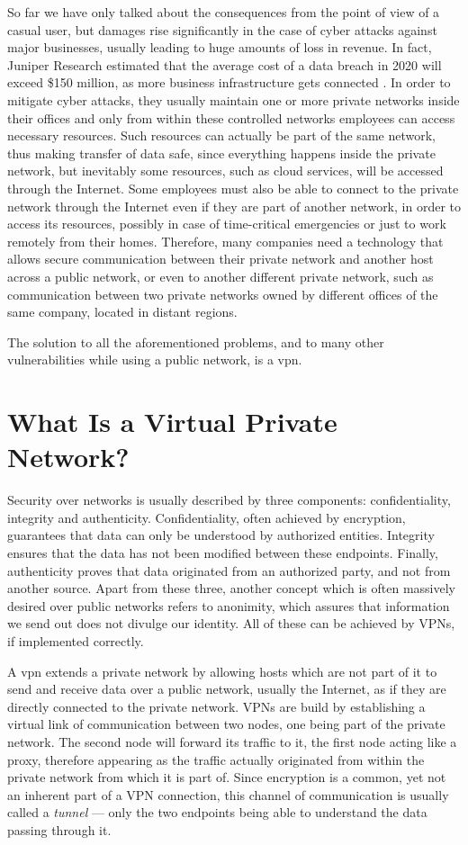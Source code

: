\documentclass[a4paper,12pt]{report}
\begin{document}
		So far we have only talked about the consequences from the point of view of a casual user, but damages rise significantly in the case of cyber attacks against major businesses, usually leading to huge amounts of loss in revenue. In fact, Juniper Research estimated that the average cost of a data breach in 2020 will exceed \$150 million, as more business infrastructure gets connected \cite{junipercybercrime}. In order to mitigate cyber attacks, they usually maintain one or more private networks inside their offices and only from within these controlled networks employees can access necessary resources. Such resources can actually be part of the same network, thus making transfer of data safe, since everything happens inside the private network, but inevitably some resources, such as cloud services, will be accessed through the Internet. Some employees must also be able to connect to the private network through the Internet even if they are part of another network, in order to access its resources, possibly in case of time-critical emergencies or just to work remotely from their homes. Therefore, many companies need a technology that allows secure communication between their private network and another host across a public network, or even to another different private network, such as communication between two private networks owned by different offices of the same company, located in distant regions.
		
		The solution to all the aforementioned problems, and to many other vulnerabilities while using a public network, is a \acrfull{vpn}.
		
		\section{What Is a Virtual Private Network?}
		Security over networks is usually described by three components: confidentiality, integrity and authenticity. Confidentiality, often achieved by encryption, guarantees that data can only be understood by authorized entities. Integrity ensures that the data has not been modified between these endpoints. Finally, authenticity proves that data originated from an authorized party, and not from another source. Apart from these three, another concept which is often massively desired over public networks refers to anonimity, which assures that information we send out does not divulge our identity. All of these can be achieved by VPNs, if implemented correctly.
		
		A \acrfull{vpn} extends a private network by allowing hosts which are not part of it to send and receive data over a public network, usually the Internet, as if they are directly connected to the private network. VPNs are build by establishing a virtual link of communication between two nodes, one being part of the private network. The second node will forward its traffic to it, the first node acting like a proxy, therefore appearing as the traffic actually originated from within the private network from which it is part of. Since encryption is a common, yet not an inherent part of a VPN connection, this channel of communication is usually called a \textit{tunnel} --- only the two endpoints being able to understand the data passing through it. 
		
\end{document}
